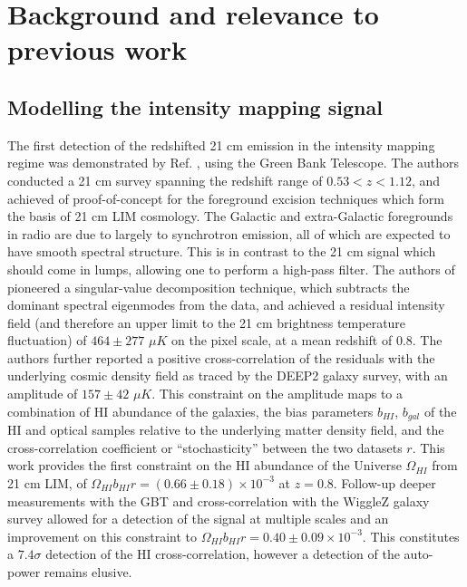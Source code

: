 \section{\label{sec:bg} Background and relevance to previous work}

\subsection{\label{sec:bg:subsec:signal} Modelling the intensity mapping signal}

The first detection of the redshifted 21 cm emission in the intensity mapping regime was demonstrated by Ref. \citep{changetal}, using the Green Bank Telescope. The authors conducted a 21 cm survey spanning the redshift range of $0.53 < z < 1.12$, and achieved of proof-of-concept for the foreground excision techniques which form the basis of 21 cm LIM cosmology. The Galactic and extra-Galactic foregrounds in radio are due to largely to synchrotron emission, all of which are expected to have smooth spectral structure. This is in contrast to the 21 cm signal which should come in lumps, allowing one to perform a high-pass filter. The authors of \citep{changetal} pioneered a singular-value decomposition technique, which subtracts the dominant spectral eigenmodes from the data, and achieved a residual intensity field (and therefore an upper limit to the 21 cm brightness temperature fluctuation) of $464 \pm 277$ $\mu K$ on the pixel scale, at a mean redshift of $0.8$. The authors further reported a positive cross-correlation of the residuals with the underlying cosmic density field as traced by the DEEP2 galaxy survey, with an amplitude of $157 \pm 42$ $\mu K$. This constraint on the amplitude maps to a combination of HI abundance of the galaxies, the bias parameters $b_{HI}$, $b_{gal}$ of the HI and optical samples relative to the underlying matter density field, and the cross-correlation coefficient or ``stochasticity'' between the two datasets $r$. This work provides the first constraint on the HI abundance of the Universe $\Omega_{HI}$ from 21 cm LIM, of $\Omega_{HI}b_{HI}r = (0.66 \pm 0.18) \times 10^{-3}$ at $z = 0.8$. Follow-up deeper measurements with the GBT \cite{masuietalgbt} and cross-correlation with the WiggleZ galaxy survey \cite{switzeretalgbt} allowed for a detection of the signal at multiple scales and an improvement on this constraint to $\Omega_{HI}b_{HI}r=0.40 \pm 0.09 \times 10^{-3}$. This constitutes a $7.4\sigma$ detection of the HI cross-correlation, however a detection of the auto-power remains elusive.

